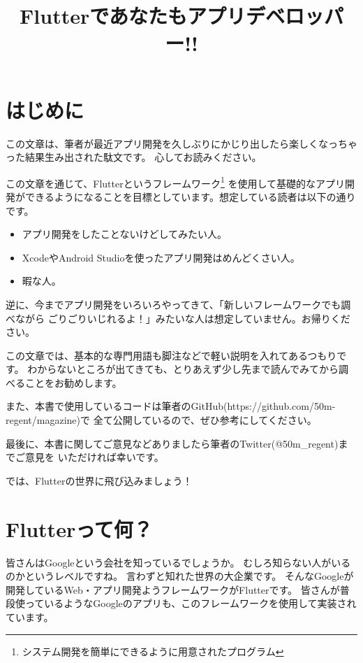\documentclass{jsarticle}
\title{Flutterであなたもアプリデベロッパー!!}
\author{}
\date{}
\begin{document}
    \maketitle
    \tableofcontents

    \section*{はじめに}
        この文章は、筆者が最近アプリ開発を久しぶりにかじり出したら楽しくなっちゃった結果生み出された駄文です。
        心してお読みください。

        この文章を通じて、Flutterというフレームワーク\footnote{システム開発を簡単にできるように用意されたプログラム}
        を使用して基礎的なアプリ開発ができるようになることを目標としています。想定している読者は以下の通りです。

        \begin{itemize}
            \item アプリ開発をしたことないけどしてみたい人。
            \item XcodeやAndroid Studioを使ったアプリ開発はめんどくさい人。
            \item 暇な人。
        \end{itemize}

        逆に、今までアプリ開発をいろいろやってきて、「新しいフレームワークでも調べながら
        ごりごりいじれるよ！」みたいな人は想定していません。お帰りください。

        この文章では、基本的な専門用語も脚注などで軽い説明を入れてあるつもりです。
        わからないところが出てきても、とりあえず少し先まで読んでみてから調べることをお勧めします。

        また、本書で使用しているコードは筆者のGitHub(https://github.com/50m-regent/magazine)で
        全て公開しているので、ぜひ参考にしてください。

        最後に、本書に関してご意見などありましたら筆者のTwitter(@50m\_regent)までご意見を
        いただければ幸いです。

        では、Flutterの世界に飛び込みましょう！

    \section*{Flutterって何？}
        皆さんはGoogleという会社を知っているでしょうか。
        むしろ知らない人がいるのかというレベルですね。
        言わずと知れた世界の大企業です。
        そんなGoogleが開発しているWeb・アプリ開発ようフレームワークがFlutterです。
        皆さんが普段使っているようなGoogleのアプリも、このフレームワークを使用して実装されています。
\end{document}
